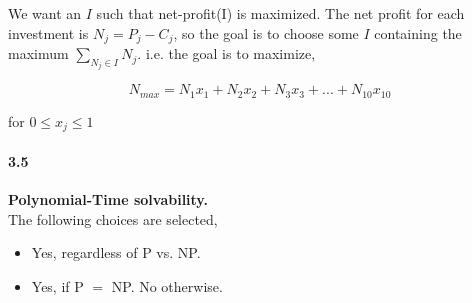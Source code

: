 \documentclass{article}
\begin{document}
\noindent
We want an $I$ such that net-profit(I) is maximized. The net profit for each investment is $N_j = P_j - C_j$, so the goal is to choose some
$I$ containing the maximum $\sum_{N_j \in I} N_j$.
i.e. the goal is to maximize,

$$N_{max} = N_1x_1 + N_2x_2 + N_3x_3 + ... + N_{10}x_{10}$$

for $0 \leq x_j \leq 1$

\paragraph*{3.5} \textbf{Polynomial-Time solvability.} \\


\noindent
The following choices are selected,

\begin{itemize}
\item Yes, regardless of P vs. NP.
\item Yes, if P $=$ NP. No otherwise.
\end{itemize}
\end{document}
